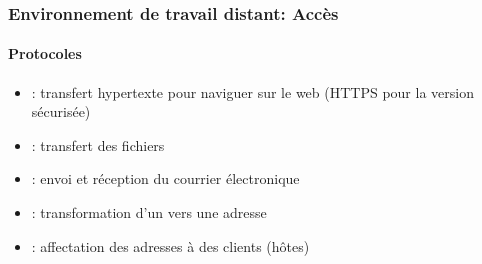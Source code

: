 \documentclass[xcolor=table]{beamer}
\begin{document}
\begin{frame}
\frametitle{Environnement de travail distant: Accès}
\framesubtitle{Protocoles}

\begin{itemize}
	\item {}: transfert hypertexte pour naviguer sur le web  (HTTPS pour la
	version sécurisée)
	\item {}: transfert des fichiers
	\item {}: envoi et réception du courrier électronique
	\item {}: transformation d'un  vers une adresse 
	\item {}: affectation des adresses  à des clients (hôtes)
\end{itemize}

\end{frame}
\end{document}
